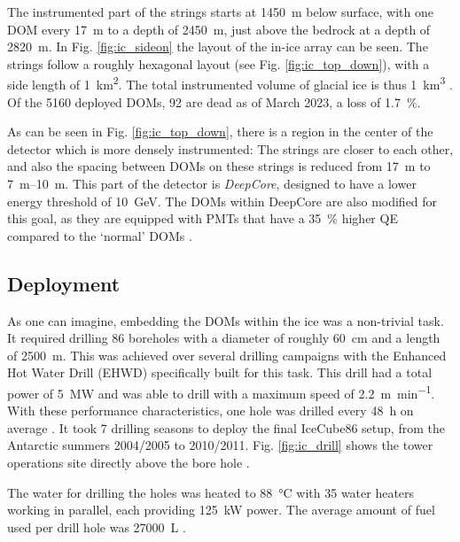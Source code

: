 The instrumented part of the strings starts at \SI{1450}{\m} below surface, with one DOM every \SI{17}{\m} to a depth of \SI{2450}{\m}, just above the bedrock at a depth of \SI{2820}{\m}. In Fig. \ref{fig:ic_sideon} the layout of the in-ice array can be seen. The strings follow a roughly hexagonal layout (see Fig. \ref{fig:ic_top_down}), with a side length of \SI{1}{\km\squared}. The total instrumented volume of glacial ice is thus \SI{1}{\km\cubed} \cite{Aartsen2017}. Of the 5160 deployed DOMs, 92 are dead as of March 2023, a loss of \SI{1.7}{\percent}.

As can be seen in Fig. \ref{fig:ic_top_down}, there is a region in the center of the detector which is more densely instrumented: The strings are closer to each other, and also the spacing between DOMs on these strings is reduced from \SI{17}{\m} to \SIrange{7}{10}{\m}. This part of the detector is \textit{DeepCore}, designed to have a lower energy threshold of \SI{10}{\GeV}. The DOMs within DeepCore are also modified for this goal, as they are equipped with PMTs that have a \SI{35}{\percent} higher QE compared to the `normal' DOMs \cite{Aartsen2017}. 


\subsection{Deployment}
As one can imagine, embedding the DOMs within the ice was a non-trivial task. It required drilling 86 boreholes with a diameter of roughly \SI{60}{\cm} and a length of \SI{2500}{\m}. This was achieved over several drilling campaigns with the Enhanced Hot Water Drill (EHWD) specifically built for this task. This drill had a total power of \SI{5}{\mega\W} and was able to drill with a maximum speed of \SI{2.2}{\meter\per\minute}. With these performance characteristics, one hole was drilled every \SI{48}{\hour} on average \cite{Aartsen2017}. It took 7 drilling seasons to deploy the final IceCube86 setup, from the Antarctic summers 2004/2005 to 2010/2011. Fig. \ref{fig:ic_drill} shows the tower operations site directly above the bore hole .

The water for drilling the holes was heated to \SI{88}{\celsius} with 35 water heaters working in parallel, each providing \SI{125}{\kilo\W} power. The average amount of fuel used per drill hole was \SI{27000}{\liter} \cite{Benson2014}. 

